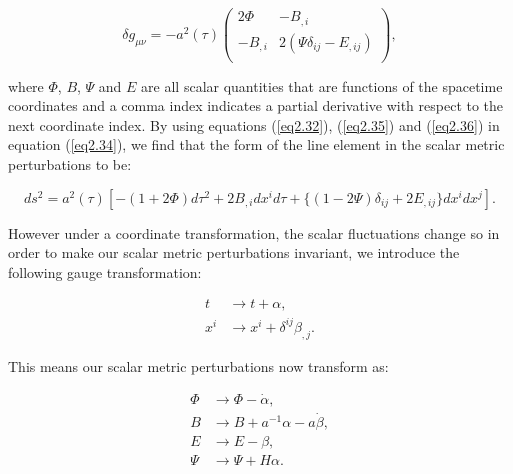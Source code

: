 \documentclass[a4paper,12pt,twoside]{report}
\begin{document}
\begin{equation} \label{eq2.36}
\delta g_{\mu \nu} = - a^{2}(\tau) \begin{pmatrix}
	2\Phi & -B_{,i} \\[0.3em]
	-B_{,i} & 2(\Psi \delta_{ij} - E_{,ij}) \\[0.3em]
\end{pmatrix},
\end{equation}

where $\Phi$, $B$, $\Psi$ and $E$ are all scalar quantities that are functions of the spacetime coordinates and a comma index indicates a partial derivative with respect to the next coordinate index. By using equations (\ref{eq2.32}), (\ref{eq2.35}) and (\ref{eq2.36}) in equation (\ref{eq2.34}), we find that the form  of the line element in the scalar metric perturbations \cite{Mukhanov:1990me, Langlois:2004de, Baumann:2009ds, lyth2009primordial, Weinberg:2008zzc} to be:

\begin{equation} \label{eq2.37}
ds^{2} = a^{2}(\tau)\left[-(1+2\Phi)d\tau^{2} + 2B_{,i}dx^{i}d\tau + \{(1 - 2\Psi)\delta_{ij} + 2E_{,ij}\}dx^{i}dx^{j} \right].
\end{equation}

However under a coordinate transformation, the scalar fluctuations change so in order to make our scalar metric perturbations invariant, we introduce the following gauge transformation:

\begin{subequations}
\begin{align}
t &\rightarrow t + \alpha, \label{eq2.38a} \\
x^{i} &\rightarrow x^{i} + \delta^{ij}\beta_{,j}. \label{eq2.38b}
\end{align}
\end{subequations}

This means our scalar metric perturbations now transform as:

\begin{subequations}
\begin{align}
\Phi &\rightarrow \Phi - \dot{\alpha}, \label{eq2.39a} \\
B &\rightarrow B + a^{-1}\alpha - a\dot{\beta}, \label{eq2.39b} \\
E &\rightarrow E - \beta, \label{eq2.39c} \\
\Psi &\rightarrow \Psi + H\alpha. \label{eq2.39d}
\end{align}
\end{subequations}
\end{document}
